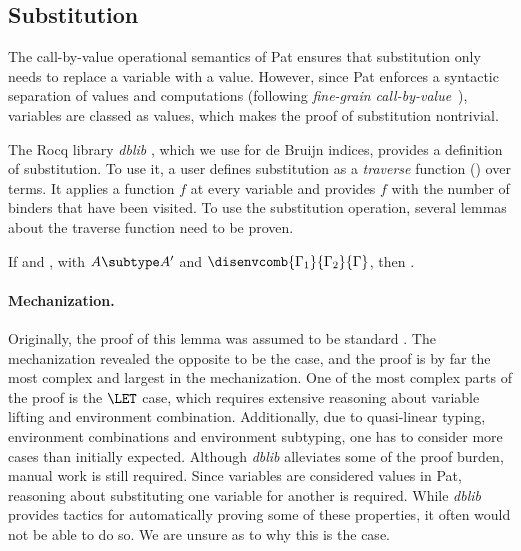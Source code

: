 \subsection{Substitution}
\label{sec:substitution}


The call-by-value operational semantics of Pat ensures that substitution only
needs to replace a variable with a value.  However, since Pat enforces a
syntactic separation of values and computations
(following \emph{fine-grain
call-by-value}~\cite{levyModellingEnvironmentsCallbyvalue2003}), variables are
classed as values, which makes the proof of substitution nontrivial.

The Rocq library \emph{dblib} \cite{pottierDblib2021}, which we use for de
Bruijn indices, provides a definition of substitution.  To use it, a user
defines substitution as a \emph{traverse} function
()
over terms. It applies a function $f$ at every variable and provides $f$
with the number of binders that have been visited.  
To use the substitution operation, several lemmas about the traverse function need to be proven.
%

\begin{lemma}
  If  and , with $A \subtype A'$ and $\disenvcomb{\Gamma_1}{\Gamma_2}{\Gamma}$,
  then .
  \label{lemma:substitution}
\end{lemma}

\paragraph{Mechanization.}
Originally, the proof of this lemma was assumed to be standard
\cite{deliguoroMailboxTypesUnordered2018,fowlerSpecialDeliveryProgramming2023}.
The mechanization revealed the opposite to be the case, and the proof is by far
the most complex and largest in the mechanization.
%
One of the most complex parts of the proof is the $\LET$ case, which requires
%
extensive reasoning about variable lifting and environment combination.
Additionally, due to quasi-linear typing, environment combinations and
environment subtyping, one has to consider more cases than initially expected.
%
Although \emph{dblib} alleviates some of the proof burden, manual work is still
required.  Since variables are considered values in Pat, reasoning about
substituting one variable for another is required.  While \emph{dblib} provides
tactics for automatically proving some of these properties, it often would not
be able to do so.  We are unsure as to why this is the case.
